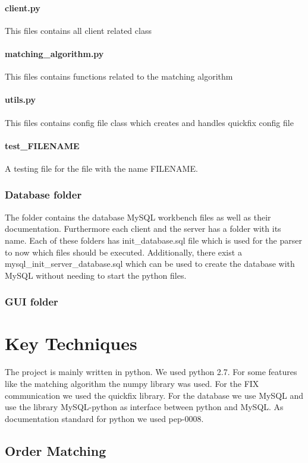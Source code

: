 \documentclass[a4paper, 11pt]{article}
\begin{document}
\paragraph*{client.py} This files contains all client related class
\paragraph*{matching\_algorithm.py} This files contains functions related to the matching algorithm
\paragraph*{utils.py} This files contains config file class which creates and handles quickfix config file 
\paragraph*{test\_FILENAME} A testing file for the file with the name FILENAME.

\subsubsection*{Database folder} 
The folder contains the database MySQL workbench files as well as their documentation. Furthermore each client and the server has
a folder with its name. Each of these folders has init\_database.sql file which is used for the parser to now which files should be
executed. Additionally, there exist a mysql\_init\_server\_database.sql which can be used to create the database with MySQL without
needing to start the python files.

\subsubsection*{GUI folder}

\section*{Key Techniques}

The project is mainly written in python. We used python 2.7. For some features like the matching algorithm the numpy library \cite{numpy} was used.
For the FIX communication we used the quickfix library. For the database we use MySQL and use the library MySQL-python as interface between python and MySQL.
As documentation standard for python we used pep-0008.
\subsection*{Order Matching}
\end{document}
